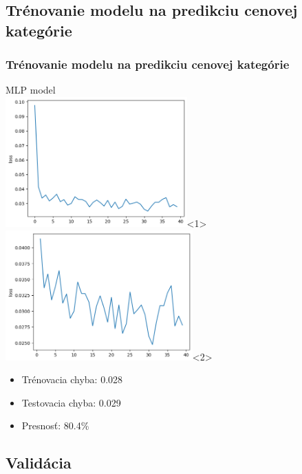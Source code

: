 \documentclass[slovak]{beamer}
\begin{document}
\subsection{Trénovanie modelu na predikciu cenovej kategórie}

\begin{frame}
	\frametitle{Trénovanie modelu na predikciu cenovej kategórie}
	MLP model \\
	\includegraphics[height=5cm]{images/mlp_train_loss_1.png}<1>
	\includegraphics[height=5cm]{images/mlp_train_loss_2.png}<2>
	\begin{itemize}
		\item<1-> Trénovacia chyba: 0.028
		\item<1-> Testovacia chyba: 0.029
		\item<1-> Presnosť: 80.4\%
	\end{itemize}
\end{frame}

\subsection{Validácia}
\end{document}
